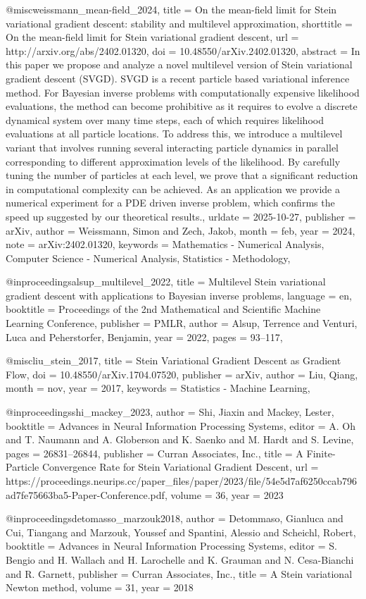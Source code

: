 @misc{weissmann_mean-field_2024,
	title = {On the mean-field limit for {Stein} variational gradient descent: stability and multilevel approximation},
	shorttitle = {On the mean-field limit for {Stein} variational gradient descent},
	url = {http://arxiv.org/abs/2402.01320},
	doi = {10.48550/arXiv.2402.01320},
	abstract = {In this paper we propose and analyze a novel multilevel version of Stein variational gradient descent (SVGD). SVGD is a recent particle based variational inference method. For Bayesian inverse problems with computationally expensive likelihood evaluations, the method can become prohibitive as it requires to evolve a discrete dynamical system over many time steps, each of which requires likelihood evaluations at all particle locations. To address this, we introduce a multilevel variant that involves running several interacting particle dynamics in parallel corresponding to different approximation levels of the likelihood. By carefully tuning the number of particles at each level, we prove that a significant reduction in computational complexity can be achieved. As an application we provide a numerical experiment for a PDE driven inverse problem, which confirms the speed up suggested by our theoretical results.},
	urldate = {2025-10-27},
	publisher = {arXiv},
	author = {Weissmann, Simon and Zech, Jakob},
	month = feb,
	year = {2024},
	note = {arXiv:2402.01320},
	keywords = {Mathematics - Numerical Analysis, Computer Science - Numerical Analysis, Statistics - Methodology},
}

@inproceedings{alsup_multilevel_2022,
	title = {Multilevel {Stein} variational gradient descent with applications to {Bayesian} inverse problems},
	language = {en},
	booktitle = {Proceedings of the 2nd {Mathematical} and {Scientific} {Machine} {Learning} {Conference}},
	publisher = {PMLR},
	author = {Alsup, Terrence and Venturi, Luca and Peherstorfer, Benjamin},
	year = {2022},
	pages = {93--117},
}

@misc{liu_stein_2017,
	title = {Stein {Variational} {Gradient} {Descent} as {Gradient} {Flow}},
	doi = {10.48550/arXiv.1704.07520},
	publisher = {arXiv},
	author = {Liu, Qiang},
	month = nov,
	year = {2017},
	keywords = {Statistics - Machine Learning},
}

@inproceedings{shi_mackey_2023,
 author = {Shi, Jiaxin and Mackey, Lester},
 booktitle = {Advances in Neural Information Processing Systems},
 editor = {A. Oh and T. Naumann and A. Globerson and K. Saenko and M. Hardt and S. Levine},
 pages = {26831--26844},
 publisher = {Curran Associates, Inc.},
 title = {A Finite-Particle Convergence Rate for Stein Variational Gradient Descent},
 url = {https://proceedings.neurips.cc/paper_files/paper/2023/file/54e5d7af6250ccab796ad7fe75663ba5-Paper-Conference.pdf},
 volume = {36},
 year = {2023}
}

@inproceedings{detomasso_marzouk2018,
 author = {Detommaso, Gianluca and Cui, Tiangang and Marzouk, Youssef and Spantini, Alessio and Scheichl, Robert},
 booktitle = {Advances in Neural Information Processing Systems},
 editor = {S. Bengio and H. Wallach and H. Larochelle and K. Grauman and N. Cesa-Bianchi and R. Garnett},
 publisher = {Curran Associates, Inc.},
 title = {A Stein variational Newton method},
 volume = {31},
 year = {2018}
}
